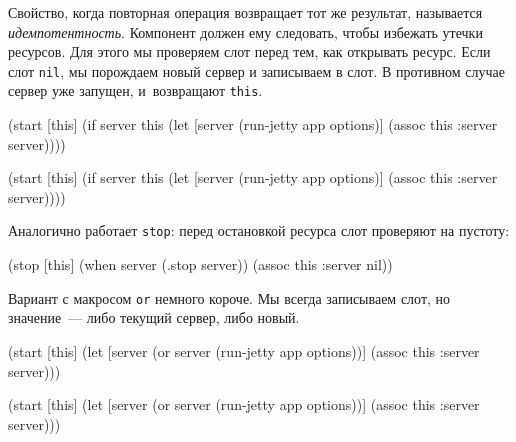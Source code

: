 
Свойство, когда повторная операция возвращает тот же результат, называется
\emph{идемпотентность}. Компонент должен ему следовать, чтобы избежать утечки
ресурсов. Для этого мы проверяем слот перед тем, как открывать ресурс. Если слот
\verb|nil|, мы порождаем новый сервер и записываем в слот. В противном случае
сервер уже запущен, и~возвращают \verb|this|.

\ifnarrow

\begin{english}
  \begin{clojure}
(start [this]
  (if server
    this
    (let [server (run-jetty
                   app options)]
      (assoc this :server server))))
  \end{clojure}
\end{english}

\else

\begin{english}
  \begin{clojure}
(start [this]
  (if server
    this
    (let [server (run-jetty app options)]
      (assoc this :server server))))
  \end{clojure}
\end{english}

\fi

\noindent
Аналогично работает \verb|stop|: перед остановкой ресурса слот проверяют на
пустоту:

\begin{english}
  \begin{clojure}
(stop [this]
  (when server
    (.stop server))
  (assoc this :server nil))
  \end{clojure}
\end{english}

Вариант с макросом \verb|or| немного короче. Мы всегда записываем слот, но
значение~--- либо текущий сервер, либо новый.

\ifnarrow

\begin{english}
  \begin{clojure}
(start [this]
  (let [server (or server
                   (run-jetty
                     app options))]
    (assoc this :server server)))
  \end{clojure}
\end{english}

\else

\begin{english}
  \begin{clojure}
(start [this]
  (let [server (or server
                   (run-jetty app options))]
    (assoc this :server server)))
  \end{clojure}
\end{english}

